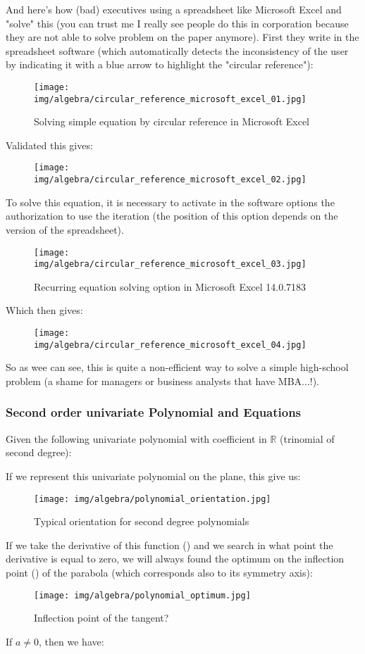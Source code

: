 	
	And here's how (bad) executives using a spreadsheet like Microsoft Excel and "solve" this (you can trust me I really see people do this in corporation because they are not able to solve problem on the paper anymore). First they write in the spreadsheet software (which automatically detects the inconsistency of the user by indicating it with a blue arrow to highlight the "circular reference"):
	\begin{figure}[H]
		\centering
		\texttt{[image: img/algebra/circular\_reference\_microsoft\_excel\_01.jpg]}
		\caption{Solving simple equation by circular reference in Microsoft Excel}
	\end{figure}
	Validated this gives:
	\begin{figure}[H]
		\centering
		\texttt{[image: img/algebra/circular\_reference\_microsoft\_excel\_02.jpg]}
	\end{figure}
	To solve this equation, it is necessary to activate in the software options the authorization to use the iteration (the position of this option depends on the version of the spreadsheet). 
	\begin{figure}[H]
		\centering
		\texttt{[image: img/algebra/circular\_reference\_microsoft\_excel\_03.jpg]}
		\caption[]{Recurring equation solving option in Microsoft Excel 14.0.7183}
	\end{figure}
	Which then gives:
	\begin{figure}[H]
		\centering
		\texttt{[image: img/algebra/circular\_reference\_microsoft\_excel\_04.jpg]}
	\end{figure}
	So as wee can see, this is quite a non-efficient way to solve a simple high-school problem (a shame for managers or business analysts that have MBA...!).

	\subsubsection{Second order univariate Polynomial and Equations}\label{second order polynomials}
	Given the following univariate polynomial with coefficient in $\mathbb{R}$ (trinomial of second degree):
	
	If we represent this univariate polynomial on the plane, this give us:
	\begin{figure}[H]
		\centering
		\texttt{[image: img/algebra/polynomial\_orientation.jpg]}
		\caption{Typical orientation for second degree polynomials}
	\end{figure}
	If we take the derivative of this function () and we search in what point the derivative is equal to zero, we will always found the optimum on the inflection point () of the parabola (which corresponds also to its symmetry axis):
	\begin{figure}[H]
		\centering
		\texttt{[image: img/algebra/polynomial\_optimum.jpg]}
		\caption{Inflection point of the tangent?}
	\end{figure}
	If $a\neq 0$, then we have:
	
